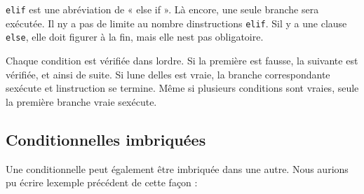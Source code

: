 \begin{Shaded}
\begin{Highlighting}[]
\OperatorTok{\textless{}}
    \NormalTok{(}\NormalTok{)}
\OperatorTok{\textgreater{}}
    \NormalTok{(}\NormalTok{)}
\NormalTok{:}
    \NormalTok{(}\NormalTok{)}
\end{Highlighting}
\end{Shaded}

\texttt{elif} est une abréviation de « else if ». Là encore, une seule
branche sera exécutée. Il n\textquotesingle y a pas de limite au nombre
d\textquotesingle instructions \texttt{elif}. S\textquotesingle il y a
une clause \texttt{else}, elle doit figurer à la fin, mais elle
n\textquotesingle est pas obligatoire.

Chaque condition est vérifiée dans l\textquotesingle ordre. Si la
première est fausse, la suivante est vérifiée, et ainsi de suite. Si
l\textquotesingle une d\textquotesingle elles est vraie, la branche
correspondante s\textquotesingle exécute et
l\textquotesingle instruction se termine. Même si plusieurs conditions
sont vraies, seule la première branche vraie s\textquotesingle exécute.

\hypertarget{conditionnelles-imbriquuxe9es}{%
\subsection{Conditionnelles
imbriquées}\label{conditionnelles-imbriquuxe9es}}

Une conditionnelle peut également être imbriquée dans une autre. Nous
aurions pu écrire l\textquotesingle exemple précédent de cette façon :

\begin{Shaded}
\begin{Highlighting}[]
\OperatorTok{==}
    \NormalTok{(}\NormalTok{)}
\NormalTok{:}
    \OperatorTok{\textless{}}
        \NormalTok{(}\NormalTok{)}
    \NormalTok{:}
        \NormalTok{(}\NormalTok{)}
\end{Highlighting}
\end{Shaded}

